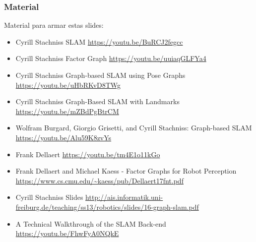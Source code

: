 \begin{frame}
    \frametitle{Material}
    
    Material para armar estas slides:
    \begin{itemize}
        \item Cyrill Stachniss SLAM \url{https://youtu.be/BuRCJ2fegcc}
        \item Cyrill Stachniss Factor Graph \url{https://youtu.be/uuiaqGLFYa4}
        \item Cyrill Stachniss Graph-based SLAM using Pose Graphs \url{https://youtu.be/uHbRKvD8TWg}
        \item Cyrill Stachniss Graph-Based SLAM with Landmarks \url{https://youtu.be/mZBdPgBtrCM}
        \item Wolfram Burgard, Giorgio Grisetti, and Cyrill Stachniss: Graph-based SLAM \url{https://youtu.be/Alu59K8zvYs}
        \item Frank Dellaert \url{https://youtu.be/tm4E1o11kGo}
        \item Frank Dellaert and Michael Kaess - Factor Graphs for Robot Perception \url{https://www.cs.cmu.edu/~kaess/pub/Dellaert17fnt.pdf}
        \item Cyrill Stachniss Slides \url{http://ais.informatik.uni-freiburg.de/teaching/ss13/robotics/slides/16-graph-slam.pdf}
        \item A Technical Walkthrough of the SLAM Back-end \url{https://youtu.be/FhwFyA0NQkE}
    \end{itemize}
    
\end{frame}

